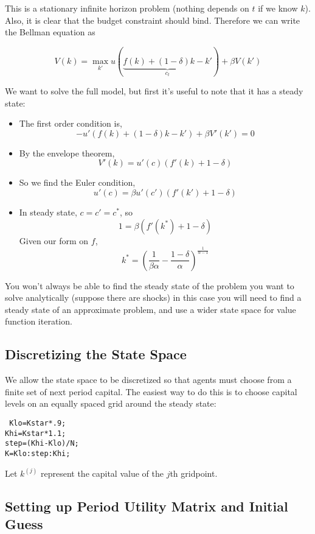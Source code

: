 \documentclass[twoside]{article}
\begin{document}
This is a stationary infinite horizon problem (nothing depends on $t$ if we know $k$). Also, it is clear that the budget constraint should bind. 
Therefore we can write the Bellman equation as

$$ V(k) = \max_{k'} u(\underbrace{f(k) + (1- \delta)k - k'}_{c_t}) + \beta V(k')$$

We want to solve the full model, but first it's useful to note that it has a steady state: 
\begin{itemize}
\item The first order condition is, 
$$ - u'(f(k) + (1-\delta)k - k') + \beta V'(k') = 0 $$
\item By the envelope theorem, 
$$ V'(k) = u'(c)(f'(k) + 1 - \delta) $$
\item So we find the Euler condition, 
$$ u'(c) = \beta u'(c')(f'(k') + 1 - \delta) $$
\item In steady state, $c = c' = c^*$, so
$$ 1 = \beta(f'(k^*) + 1 - \delta) $$
Given our form on $f$, 
$$k^* = \left(\frac{1}{\beta \alpha} - \frac{1 - \delta}{\alpha}\right)^\frac{1}{\alpha - 1}$$
\end{itemize}
You won't always be able to find the steady state of the problem you want to solve analytically (suppose there are shocks)
in this case you will need to find a steady state of an approximate problem, and use a wider state space for value function iteration.

\subsection{Discretizing the State Space}

We allow the state space to be discretized so that agents must choose from a finite set of next period capital. The easiest way to do this is to 
choose capital levels on an equally spaced grid around the steady state:

{\tt 
Klo=Kstar*.9; \\
Khi=Kstar*1.1; \\
step=(Khi-Klo)/N; \\
K=Klo:step:Khi; \\
}

Let $k^{(j)}$ represent the capital value of the $j$th gridpoint. 

\subsection{Setting up Period Utility Matrix and Initial Guess} 
\end{document}
